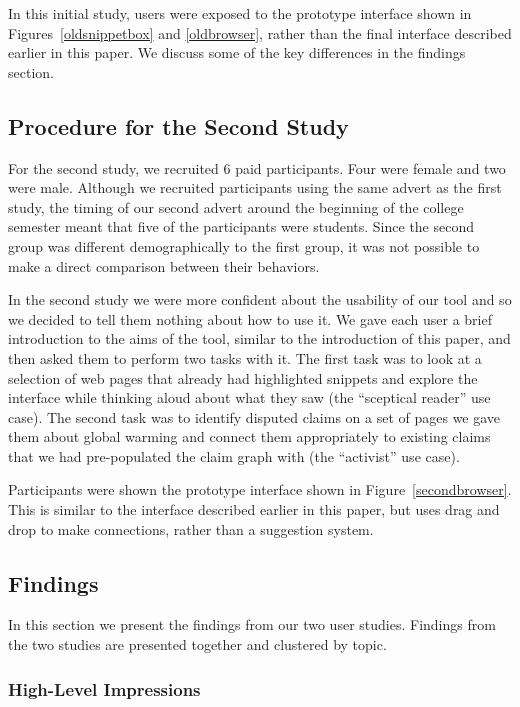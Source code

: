 \documentclass{chi2009}
\begin{document}
In this initial study, users were exposed to the prototype interface shown in Figures~\ref{oldsnippetbox} and \ref{oldbrowser}, rather than the final interface described earlier in this paper. We discuss some of the key differences in the findings section.

\subsection{Procedure for the Second Study}

For the second study, we recruited 6 paid participants. Four were female and two were male. Although we recruited participants using the same advert as the first study, the timing of our second advert around the beginning of the college semester meant that five of the participants were students. Since the second group was different demographically to the first group, it was not possible to make a direct comparison between their behaviors. 

In the second study we were more confident about the usability of our tool and so we decided to tell them nothing about how to use it. We gave each user a brief introduction to the aims of the tool, similar to the introduction of this paper, and then asked them to perform two tasks with it. The first task was to look at a selection of web pages that already had highlighted snippets and explore the interface while thinking aloud about what they saw (the ``sceptical reader'' use case). The second task was to identify disputed claims on a set of pages we gave them about global warming and connect them appropriately to existing claims that we had pre-populated the claim graph with (the ``activist'' use case). 

Participants were shown the prototype interface shown in Figure~\ref{secondbrowser}. This is similar to the interface described earlier in this paper, but uses drag and drop to make connections, rather than a suggestion system.

\subsection{Findings}

In this section we present the findings from our two user studies. Findings from the two studies are presented together and clustered by topic.

\subsubsection{High-Level Impressions}
\end{document}
